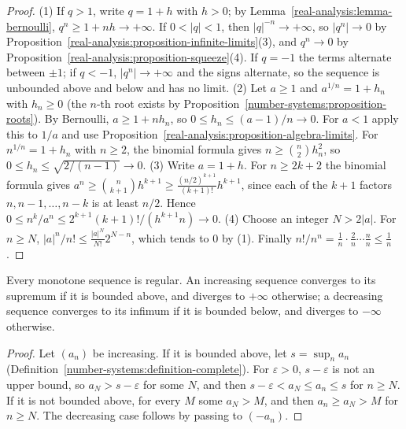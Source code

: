 \begin{proof}
(1) If $q > 1$, write $q = 1 + h$ with $h > 0$; by Lemma~\ref{real-analysis:lemma-bernoulli}, $q^n \geq 1 + nh \to +\infty$. If $0 < |q| < 1$, then $|q|^{-n} \to +\infty$, so $|q^n| \to 0$ by
Proposition~\ref{real-analysis:proposition-infinite-limits}(3), and $q^n \to 0$ by Proposition~\ref{real-analysis:proposition-squeeze}(4). If $q = -1$ the terms alternate between $\pm1$; if $q < -1$, $|q^n| \to +\infty$
and the signs alternate, so the sequence is unbounded above and below and has no limit.
(2) Let $a \geq 1$ and $a^{1/n} = 1 + h_n$ with $h_n \geq 0$ (the $n$-th root exists by Proposition~\ref{number-systems:proposition-roots}). By Bernoulli, $a \geq 1 + nh_n$, so $0 \leq h_n \leq (a - 1)/n \to 0$. For
$a < 1$ apply this to $1/a$ and use Proposition~\ref{real-analysis:proposition-algebra-limits}. For $n^{1/n} = 1 + h_n$ with $n \geq 2$, the binomial formula gives $n \geq \binom{n}{2}h_n^2$, so
$0 \leq h_n \leq \sqrt{2/(n - 1)} \to 0$.
(3) Write $a = 1 + h$. For $n \geq 2k + 2$ the binomial formula gives $a^n \geq \binom{n}{k+1}h^{k+1} \geq \frac{(n/2)^{k+1}}{(k+1)!}h^{k+1}$, since each of the $k + 1$ factors $n, n - 1, \ldots, n - k$ is at least $n/2$.
Hence $0 \leq n^k/a^n \leq 2^{k+1}(k + 1)!/(h^{k+1}n) \to 0$.
(4) Choose an integer $N > 2|a|$. For $n \geq N$, $|a|^n/n! \leq \frac{|a|^N}{N!}2^{N-n}$, which tends to $0$ by (1). Finally $n!/n^n = \frac1n\cdot\frac2n\cdots\frac nn \leq \frac1n$.
\end{proof}

\begin{proposition}\label{real-analysis:proposition-monotone-regular}
Every monotone sequence is regular. An increasing sequence converges to its supremum if it is bounded above, and diverges to $+\infty$ otherwise; a decreasing sequence converges to its infimum if it is
bounded below, and diverges to $-\infty$ otherwise.
\end{proposition}

\begin{proof}
Let $(a_n)$ be increasing. If it is bounded above, let $s = \sup_na_n$ (Definition~\ref{number-systems:definition-complete}). For $\varepsilon > 0$, $s - \varepsilon$ is not an upper bound, so $a_N > s - \varepsilon$ for
some $N$, and then $s - \varepsilon < a_N \leq a_n \leq s$ for $n \geq N$. If it is not bounded above, for every $M$ some $a_N > M$, and then $a_n \geq a_N > M$ for $n \geq N$. The decreasing case follows by
passing to $(-a_n)$.
\end{proof}

